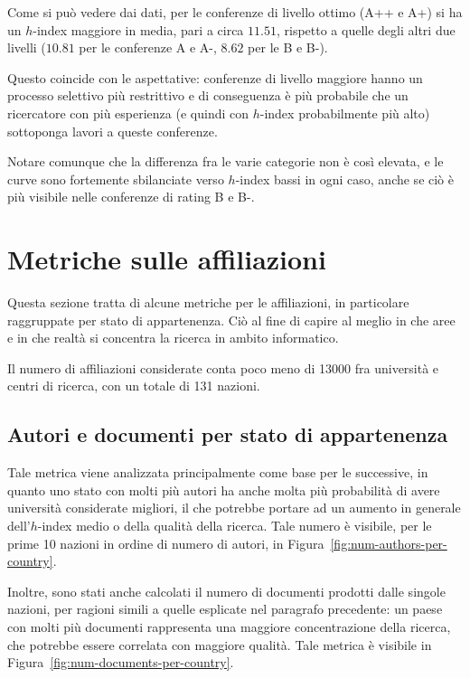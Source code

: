 Come si può vedere dai dati, per le conferenze di livello ottimo (A++ e A+)
si ha un $h$-index maggiore in media, pari a circa $11.51$, rispetto a quelle
degli altri due livelli ($10.81$ per le conferenze A e A-, $8.62$ per le B e
B-).

Questo coincide con le aspettative: conferenze di livello maggiore hanno
un processo selettivo più restrittivo e di conseguenza è più probabile
che un ricercatore con più esperienza (e quindi con $h$-index probabilmente
più alto) sottoponga lavori a queste conferenze.

Notare comunque che la differenza fra le varie categorie non è così elevata,
e le curve sono fortemente sbilanciate verso $h$-index bassi in ogni caso,
anche se ciò è più visibile nelle conferenze di rating B e B-.

\section{Metriche sulle affiliazioni}

Questa sezione tratta di alcune metriche per le affiliazioni, in particolare
raggruppate per stato di appartenenza. Ciò al fine di capire al meglio
in che aree e in che realtà si concentra la ricerca in ambito informatico.

Il numero di affiliazioni considerate conta poco meno di 13000 fra università
e centri di ricerca, con un totale di 131 nazioni.

\subsection{Autori e documenti per stato di appartenenza}

Tale metrica viene analizzata principalmente come base per le successive, in
quanto uno stato con molti più autori ha anche molta più probabilità di avere
università considerate migliori, il che potrebbe portare ad un aumento
in generale dell'$h$-index medio o della qualità della ricerca.
Tale numero è visibile, per le prime 10 nazioni in ordine di numero di autori,
in Figura~\ref{fig:num-authors-per-country}.

Inoltre, sono stati anche calcolati il numero di documenti prodotti dalle singole
nazioni, per ragioni simili a quelle esplicate nel paragrafo precedente: un
paese con molti più documenti rappresenta una maggiore concentrazione della
ricerca, che potrebbe essere correlata con maggiore qualità.
Tale metrica è visibile in Figura~\ref{fig:num-documents-per-country}.

